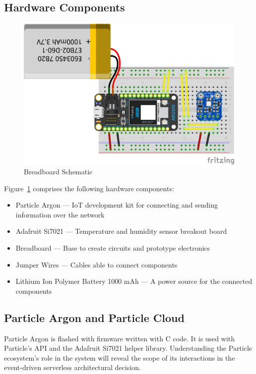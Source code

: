 \documentclass{article}
\begin{document}
\subsection{Hardware Components}
\label{section:hardware}
\begin{figure}[H]
	\center
	\includegraphics[width=\textwidth]{images/breadboard-schematic.png}
	\caption{Breadboard Schematic}
	\label{fig:breadboard_schematic}
\end{figure}

Figure~\ref{fig:breadboard_schematic} comprises the following hardware components:

\begin{itemize}
	\item Particle Argon — IoT development kit for connecting and sending information over the network
	\item Adafruit Si7021 — Temperature and humidity sensor breakout board
	\item Breadboard — Base to create circuits and prototype electronics
	\item Jumper Wires — Cables able to connect components
	\item Lithium Ion Polymer Battery 1000 mAh — A power source for the connected components
\end{itemize}

\newpage

\subsection{Particle Argon and Particle Cloud}
Particle Argon is flashed with firmware written with C code. It is used with Particle's API and the Adafruit Si7021 helper library. Understanding the Particle ecosystem's role in the system will reveal the scope of its interactions in the event-driven serverless architectural decision.
\end{document}
